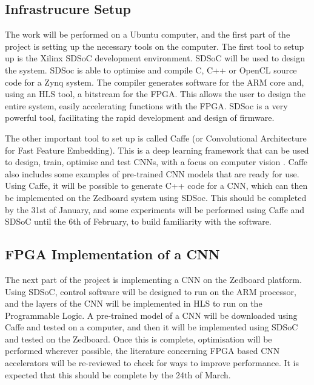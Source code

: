 \documentclass[12pt]{article}
\begin{document}
\subsection{Infrastrucure Setup}
\label{sec:ImpPlan-InfSetup}
\vspace{-12pt}

The work will be performed on a Ubuntu computer, and the first part of the project is setting up the necessary tools on the computer. The first tool to setup up is the Xilinx SDSoC development environment. SDSoC will be used to design the system. SDSoc is able to optimise and compile C, C++ or OpenCL source code for a Zynq system. The compiler generates software for the ARM core and, using an HLS tool, a bitstream for the FPGA. This allows the user to design the entire system, easily accelerating functions with the FPGA. SDSoc is a very powerful tool, facilitating the rapid development and design of firmware.

The other important tool to set up is called Caffe (or Convolutional Architecture for Fast Feature Embedding). This is a deep learning framework that can be used to design, train, optimise and test CNNs, with a focus on computer vision \cite{jia2014caffe}. Caffe also includes some examples of pre-trained CNN models that are ready for use. Using Caffe, it will be possible to generate C++ code for a CNN, which can then be implemented on the Zedboard system using SDSoc. This should be completed by the 31st of January, and some experiments will be performed using Caffe and SDSoC until the 6th of February, to build familiarity with the software.

\subsection{FPGA Implementation of a CNN}
\label{sec:ImpPlan-FPGAImplOfCnn}
\vspace{-12pt}

The next part of the project is implementing a CNN on the Zedboard platform. Using SDSoC, control software will be designed to run on the ARM processor, and the layers of the CNN will be implemented in HLS to run on the Programmable Logic. A pre-trained model of a CNN will be downloaded using Caffe and tested  on a computer, and then it will be implemented using SDSoC and tested on the Zedboard. Once this is complete, optimisation will be performed wherever possible, the literature concerning FPGA based CNN accelerators will be re-reviewed to check for ways to improve performance. It is expected that this should be complete by the 24th of March.
\end{document}
